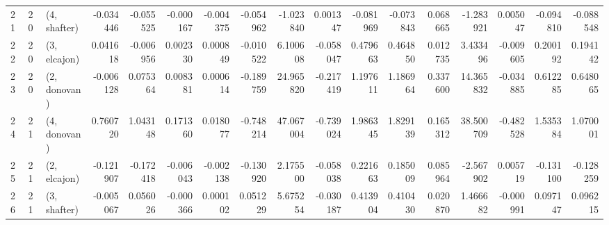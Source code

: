 \begin{tabular}{lllrrrrrrrrrrrrrr}
21 &    20 &  (4, shafter) & -0.034446 & -0.055525 &  -0.000167 & -0.004375 & -0.054962 &  -1.023840 &  0.001347 &  -0.081969 & -0.073843 &  0.068665 &  -1.283921 &  0.005047 & -0.094810 & -0.088548 \\
22 &    20 &  (3, elcajon) &  0.041618 & -0.006956 &   0.002330 &  0.000849 & -0.010522 &   6.100608 & -0.058047 &   0.479663 &  0.464850 &  0.012735 &   3.433496 & -0.009605 &  0.200192 &  0.194142 \\
23 &    20 &  (2, donovan) & -0.006128 &  0.075364 &   0.008381 &  0.000614 & -0.189759 &  24.965820 & -0.217419 &   1.197611 &  1.186964 &  0.337600 &  14.365832 & -0.034885 &  0.612285 &  0.648065 \\
24 &    21 &  (4, donovan) &  0.760720 &  1.043148 &   0.171360 &  0.018077 & -0.748214 &  47.067004 & -0.739024 &   1.986345 &  1.829139 &  0.165312 &  38.500709 & -0.482528 &  1.535384 &  1.070001 \\
25 &    21 &  (2, elcajon) & -0.121907 & -0.172418 &  -0.006043 & -0.002138 & -0.130920 &   2.175500 & -0.058038 &   0.221663 &  0.185009 &  0.085964 &  -2.567902 &  0.005719 & -0.131100 & -0.128259 \\
26 &    21 &  (3, shafter) & -0.005067 &  0.056026 &  -0.000366 &  0.000102 &  0.051229 &   5.675254 & -0.030187 &   0.413904 &  0.410430 &  0.020870 &   1.466682 & -0.000991 &  0.097147 &  0.096215 \\
\bottomrule
\end{tabular}
